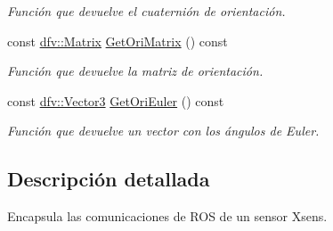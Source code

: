 \begin{DoxyCompactItemize}
\begin{DoxyCompactList}\small\item\em \-Función que devuelve el cuaternión de orientación. \end{DoxyCompactList}\item 
\hypertarget{classdfv_1_1SensorSubscriber_a87b5976432890a79361a1cfc8d39f32d}{const \hyperlink{classdfv_1_1Matrix}{dfv\-::\-Matrix} \hyperlink{classdfv_1_1SensorSubscriber_a87b5976432890a79361a1cfc8d39f32d}{\-Get\-Ori\-Matrix} () const }\label{classdfv_1_1SensorSubscriber_a87b5976432890a79361a1cfc8d39f32d}

\begin{DoxyCompactList}\small\item\em \-Función que devuelve la matriz de orientación. \end{DoxyCompactList}\item 
\hypertarget{classdfv_1_1SensorSubscriber_ac9ab6d72a5dfaffb4e810d2246fd8eff}{const \hyperlink{classdfv_1_1Vector3}{dfv\-::\-Vector3} \hyperlink{classdfv_1_1SensorSubscriber_ac9ab6d72a5dfaffb4e810d2246fd8eff}{\-Get\-Ori\-Euler} () const }\label{classdfv_1_1SensorSubscriber_ac9ab6d72a5dfaffb4e810d2246fd8eff}

\begin{DoxyCompactList}\small\item\em \-Función que devuelve un vector con los ángulos de \-Euler. \end{DoxyCompactList}\end{DoxyCompactItemize}


\subsection{\-Descripción detallada}
\-Encapsula las comunicaciones de \-R\-O\-S de un sensor \-Xsens. 

